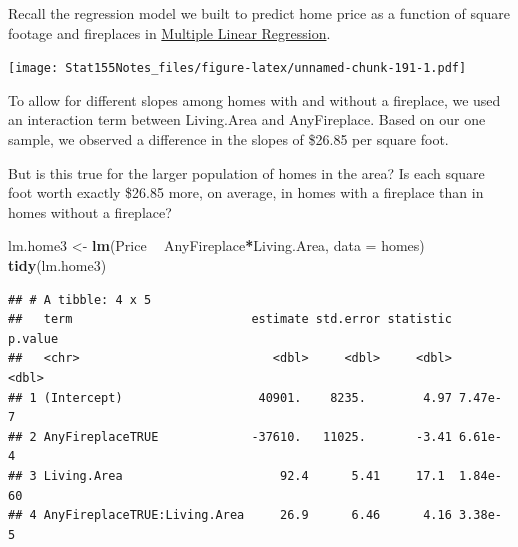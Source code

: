 \documentclass[]{book}
\newenvironment{Shaded}{\begin{snugshade}}{\end{snugshade}}
\newcommand{\DataTypeTok}[1]{\textcolor[rgb]{0.13,0.29,0.53}{#1}}
\newcommand{\DecValTok}[1]{\textcolor[rgb]{0.00,0.00,0.81}{#1}}
\newcommand{\FloatTok}[1]{\textcolor[rgb]{0.00,0.00,0.81}{#1}}
\newcommand{\KeywordTok}[1]{\textcolor[rgb]{0.13,0.29,0.53}{\textbf{#1}}}
\newcommand{\NormalTok}[1]{#1}
\newcommand{\OperatorTok}[1]{\textcolor[rgb]{0.81,0.36,0.00}{\textbf{#1}}}
\newcommand{\StringTok}[1]{\textcolor[rgb]{0.31,0.60,0.02}{#1}}
\begin{document}
Recall the regression model we built to predict home price as a function of square footage and fireplaces in \protect\hyperlink{multiple-linear-regression}{Multiple Linear Regression}.

\begin{Shaded}
\end{Shaded}

\texttt{[image: Stat155Notes\_files/figure-latex/unnamed-chunk-191-1.pdf]}

To allow for different slopes among homes with and without a fireplace, we used an interaction term between Living.Area and AnyFireplace. Based on our one sample, we observed a difference in the slopes of \$26.85 per square foot.

But is this true for the larger population of homes in the area? Is each square foot worth exactly \$26.85 more, on average, in homes with a fireplace than in homes without a fireplace?

\begin{Shaded}
\begin{Highlighting}[]
\NormalTok{lm.home3 <-}\StringTok{ }\KeywordTok{lm}\NormalTok{(Price }\OperatorTok{~}\StringTok{ }\NormalTok{AnyFireplace}\OperatorTok{*}\NormalTok{Living.Area, }\DataTypeTok{data =}\NormalTok{ homes)}
\KeywordTok{tidy}\NormalTok{(lm.home3)}
\end{Highlighting}
\end{Shaded}

\begin{verbatim}
## # A tibble: 4 x 5
##   term                         estimate std.error statistic  p.value
##   <chr>                           <dbl>     <dbl>     <dbl>    <dbl>
## 1 (Intercept)                   40901.    8235.        4.97 7.47e- 7
## 2 AnyFireplaceTRUE             -37610.   11025.       -3.41 6.61e- 4
## 3 Living.Area                      92.4      5.41     17.1  1.84e-60
## 4 AnyFireplaceTRUE:Living.Area     26.9      6.46      4.16 3.38e- 5
\end{verbatim}
\end{document}
